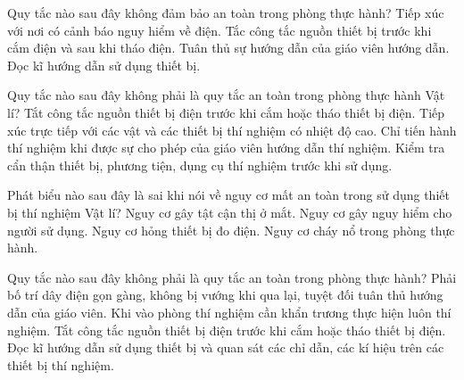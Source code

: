 \begin{ex}
Quy tắc nào sau đây không đảm bảo an toàn trong phòng thực hành?
\choice
{\True Tiếp xúc với nơi có cảnh báo nguy hiểm về điện.}
{Tắc công tắc nguồn thiết bị trước khi cắm điện và sau khi tháo điện.}
{Tuân thủ sự hướng dẫn của giáo viên hướng dẫn.}
{Đọc kĩ hướng dẫn sử dụng thiết bị.}
\end{ex}

\begin{ex}
Quy tắc nào sau đây không phải là quy tắc an toàn trong phòng thực hành Vật lí?
\choice
{Tắt công tắc nguồn thiết bị điện trước khi cắm hoặc tháo thiết bị điện.}
{\True Tiếp xúc trực tiếp với các vật và các thiết bị thí nghiệm có nhiệt độ cao.}
{Chỉ tiến hành thí nghiệm khi được sự cho phép của giáo viên hướng dẫn thí nghiệm.}
{Kiểm tra cẩn thận thiết bị, phương tiện, dụng cụ thí nghiệm trước khi sử dụng.}
\end{ex}

\begin{ex}
Phát biểu nào sau đây là sai khi nói về nguy cơ mất an toàn trong sử dụng thiết bị thí nghiệm Vật lí?
\choice
{\True Nguy cơ gây tật cận thị ở mắt.}
{Nguy cơ gây nguy hiểm cho người sử dụng.}
{Nguy cơ hỏng thiết bị đo điện.}
{Nguy cơ cháy nổ trong phòng thực hành.}
\end{ex}

\begin{ex}
Quy tắc nào sau đây không phải là quy tắc an toàn trong phòng thực hành?
\choice
{Phải bố trí dây điện gọn gàng, không bị vướng khi qua lại, tuyệt đối tuân thủ hướng dẫn của giáo viên.}
{\True Khi vào phòng thí nghiệm cần khẩn trương thực hiện luôn thí nghiệm.}
{Tắt công tắc nguồn thiết bị điện trước khi cắm hoặc tháo thiết bị điện.}
{Đọc kĩ hướng dẫn sử dụng thiết bị và quan sát các chỉ dẫn, các kí hiệu trên các thiết bị thí nghiệm.}
\end{ex}

